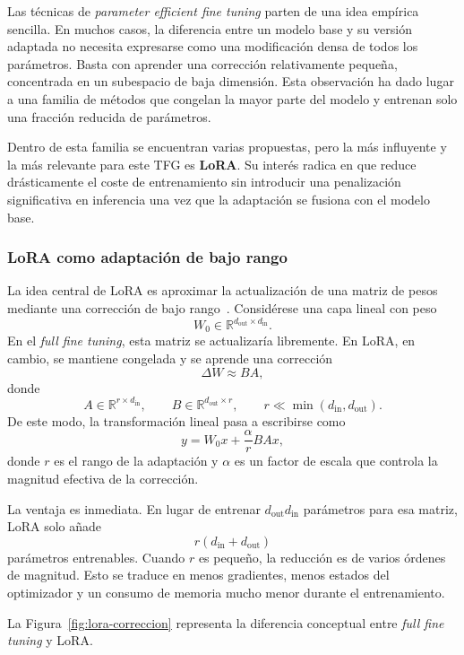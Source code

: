 Las técnicas de \textit{parameter efficient fine tuning} parten de una idea empírica sencilla. En muchos casos, la diferencia entre un modelo base y su versión adaptada no necesita expresarse como una modificación densa de todos los parámetros. Basta con aprender una corrección relativamente pequeña, concentrada en un subespacio de baja dimensión. Esta observación ha dado lugar a una familia de métodos que congelan la mayor parte del modelo y entrenan solo una fracción reducida de parámetros.

Dentro de esta familia se encuentran varias propuestas, pero la más influyente y la más relevante para este TFG es \textbf{LoRA}. Su interés radica en que reduce drásticamente el coste de entrenamiento sin introducir una penalización significativa en inferencia una vez que la adaptación se fusiona con el modelo base.

\subsubsection{LoRA como adaptación de bajo rango}
\label{sec:finetuning-lora}

La idea central de LoRA es aproximar la actualización de una matriz de pesos mediante una corrección de bajo rango~\cite{hu2021lora}. Considérese una capa lineal con peso
\[
W_0 \in \mathbb{R}^{d_{\mathrm{out}}\times d_{\mathrm{in}}}.
\]
En el \textit{full fine tuning}, esta matriz se actualizaría libremente. En LoRA, en cambio, se mantiene congelada y se aprende una corrección
\[
\Delta W \approx BA,
\]
donde
\[
A \in \mathbb{R}^{r\times d_{\mathrm{in}}},
\qquad
B \in \mathbb{R}^{d_{\mathrm{out}}\times r},
\qquad
r \ll \min(d_{\mathrm{in}},d_{\mathrm{out}}).
\]
De este modo, la transformación lineal pasa a escribirse como
\[
y
=
W_0 x
+
\frac{\alpha}{r}BAx,
\]
donde $r$ es el rango de la adaptación y $\alpha$ es un factor de escala que controla la magnitud efectiva de la corrección.

La ventaja es inmediata. En lugar de entrenar $d_{\mathrm{out}}d_{\mathrm{in}}$ parámetros para esa matriz, LoRA solo añade
\[
r(d_{\mathrm{in}} + d_{\mathrm{out}})
\]
parámetros entrenables. Cuando $r$ es pequeño, la reducción es de varios órdenes de magnitud. Esto se traduce en menos gradientes, menos estados del optimizador y un consumo de memoria mucho menor durante el entrenamiento.

La Figura~\ref{fig:lora-correccion} representa la diferencia conceptual entre \textit{full fine tuning} y LoRA.

